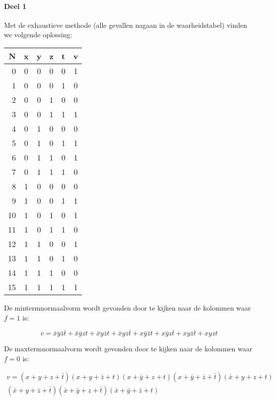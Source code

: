 \documentclass[12pt]{article}
\newcommand{\ov}[1]{\bar{#1}}
\begin{document}
\paragraph{Deel 1}
Met de exhaustieve methode (alle gevallen nagaan in de waarheidstabel) vinden we volgende oplossing:
\begin{table}[H]
\centering
\begin{tabular}{|r||c|c|c|c||c|}
	\hline
	\bf{N} & \bf{x} & \bf{y} & \bf{z} & \bf{t} & \bf{v} \\
	\hline
	0    & 0 & 0 & 0 & 0    & 1 \\
	1    & 0 & 0 & 0 & 1    & 0 \\
	2    & 0 & 0 & 1 & 0    & 0 \\
	3    & 0 & 0 & 1 & 1    & 1 \\
	4    & 0 & 1 & 0 & 0    & 0 \\
	5    & 0 & 1 & 0 & 1    & 1 \\
	6    & 0 & 1 & 1 & 0    & 1 \\
	7    & 0 & 1 & 1 & 1    & 0 \\
	8    & 1 & 0 & 0 & 0    & 0 \\
	9    & 1 & 0 & 0 & 1    & 1 \\
	10   & 1 & 0 & 1 & 0    & 1 \\
	11   & 1 & 0 & 1 & 1    & 0 \\
	12   & 1 & 1 & 0 & 0    & 1 \\
	13   & 1 & 1 & 0 & 1    & 0 \\
	14   & 1 & 1 & 1 & 0    & 0 \\
	15   & 1 & 1 & 1 & 1    & 1 \\
	\hline
\end{tabular}
\end{table}

De mintermnormaalvorm wordt gevonden door te kijken naar de kolommen waar $f = 1$ is: 

\begin{equation}
v = \ov{x}\ov{y}\ov{z}\ov{t} + \ov{x}\ov{y}zt + \ov{x}y\ov{z}t + \ov{x}yz\ov{t} + x\ov{y}\ov{z}t + x\ov{y}z\ov{t} + xy\ov{z}\ov{t} + xyzt
\end{equation}

De maxtermnormaalvorm wordt gevonden door te kijken naar de kolommen waar $f = 0$ is:

\begin{align}
v = (x+y+z+\ov{t}) (x+y+\ov{z}+t) (x+\ov{y}+z+t) (x+\ov{y}+\ov{z}+\ov{t}) (\ov{x}+y+z+t) \nonumber \\ (\ov{x}+y+\ov{z}+\ov{t}) (\ov{x}+\ov{y}+z+\ov{t}) (\ov{x}+\ov{y}+\ov{z}+t)
\end{align}
\end{document}

